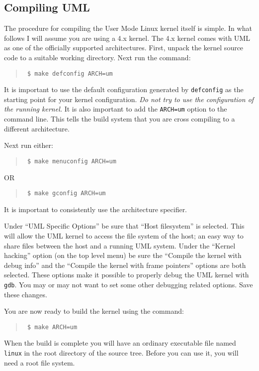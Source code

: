 \documentclass{article}
\newcommand{\command}[1]{\texttt{#1}}
\newenvironment{commands}
  {\begin{quote} \tt}
  {\end{quote}}
\begin{document}
\subsection{Compiling UML}

The procedure for compiling the User Mode Linux kernel itself is simple. In what follows I will
assume you are using a 4.x kernel. The 4.x kernel comes with UML as one of the officially
supported architectures. First, unpack the kernel source code to a suitable working directory.
Next run the command:
\begin{commands}
  \$ make defconfig ARCH=um
\end{commands}

It is important to use the default configuration generated by \command{defconfig} as the
starting point for your kernel configuration. \emph{Do not try to use the configuration of the
  running kernel.} It is also important to add the \command{ARCH=um} option to the command line.
This tells the build system that you are cross compiling to a different architecture.

Next run either:
\begin{commands}
  \$ make menuconfig ARCH=um
\end{commands}
OR
\begin{commands}
  \$ make gconfig ARCH=um
\end{commands}

It is important to consistently use the architecture specifier.

Under ``UML Specific Options'' be sure that ``Host filesystem'' is selected. This will allow the
UML kernel to access the file system of the host; an easy way to share files between the host
and a running UML system. Under the ``Kernel hacking'' option (on the top level menu) be sure
the ``Compile the kernel with debug info'' and the ``Compile the kernel with frame pointers''
options are both selected. These options make it possible to properly debug the UML kernel with
\command{gdb}. You may or may not want to set some other debugging related options. Save these
changes.

You are now ready to build the kernel using the command:
\begin{commands}
  \$ make ARCH=um
\end{commands}

When the build is complete you will have an ordinary executable file named \command{linux} in
the root directory of the source tree. Before you can use it, you will need a root file system.
\end{document}

